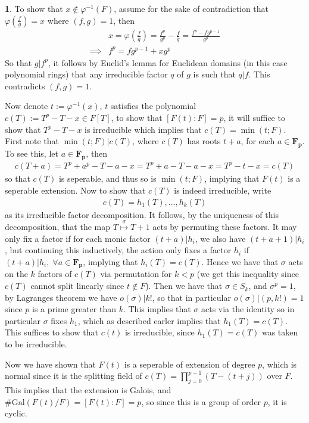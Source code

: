 \documentclass[11pt]{article}
\theoremstyle{definition}
\newtheorem{pb}{}
\newcommand{\gal}{\text{Gal}}
\begin{document}
    \begin{pb}
        To show that \(x \not \in \varphi^{-1}(F)\), assume for the sake of contradiction that \(\varphi(\frac{f}{g}) = x\) where \((f,g) = 1\), then
        \begin{align*}
            &x = \varphi(\frac{f}{g}) = \frac{f^p}{g^p} - \frac{f}{g} = \frac{f^p - fg^{p-1}}{g^p} \\
            \implies &f^p = fg^{p-1} + xg^p 
        \end{align*}
        So that \(g \vert f^p\), it follows by Euclid's lemma for Euclidean domains (in this case polynomial rings) that any irreducible factor \(q\) of \(g\) is such that \(q \vert f\). This contradicts \((f,g) = 1\).

        Now denote \(t := \varphi^{-1}(x)\), \(t\) satisfies the polynomial \(c(T) := T^p - T - x \in F[T]\), to show that \([F(t):F] = p\), it will suffice to show that \(T^p - T - x\) is irreducible which implies that \(c(T) = \min(t;F)\). First note that \(\min(t;F) \vert c(T)\), where \(c(T)\) has roots \(t + a\), for each \(a \in \mathbf{F_p}\). To see this, let \(a \in \mathbf{F_p}\), then
        \begin{align*}
            c(T + a) = T^p + a^p - T - a - x = T^p + a - T - a - x = T^p - t - x = c(T)
        \end{align*}
        so that \(c(T)\) is seperable, and thus so is \(\min(t;F)\), implying that \(F(t)\) is a seperable extension. Now to show that \(c(T)\) is indeed irreducible, write
        \begin{align*}
            c(T) = h_1(T),\hdots,h_k(T)
        \end{align*}
        as its irreducible factor decomposition. It follows, by the uniqueness of this decomposition, that the map \(T \overset{\sigma}{\mapsto} T+1\) acts by permuting these factors. It may only fix a factor if for each monic factor \((t + a) \vert h_i\), we also have \((t + a + 1) \vert h_i\), but continuing this inductively, the action only fixes a factor \(h_i\) if \((t + a) \vert h_i, \; \forall a \in \mathbf{F_p}\), implying that \(h_i(T) = c(T)\). Hence we have that \(\sigma\) acts on the \(k\) factors of \(c(T)\) via permutation for \(k < p\) (we get this inequality since \(c(T)\) cannot split linearly since \(t \not \in F\)). Then we have that \(\sigma \in S_k\), and \(\sigma^p = 1\), by Lagranges theorem we have \(o(\sigma) \vert k!\), so that in particular \(o(\sigma) \vert (p,k!) = 1\) since \(p\) is a prime greater than \(k\). This implies that \(\sigma\) acts via the identity so in particular \(\sigma\) fixes \(h_1\), which as described earler implies that \(h_1(T) = c(T)\). This suffices to show that \(c(t)\) is irreducible, since \(h_1(T) = c(T)\) was taken to be irreducible.

        Now we have shown that \(F(t)\) is a seperable of extension of degree \(p\), which is normal since it is the splitting field of \(c(T) = \prod_{j=0}^{p-1}(T-(t+j))\) over \(F\). This implies that the extension is Galois, and \(\# \gal(F(t)/F) = [F(t):F] = p\), so since this is a group of order \(p\), it is cyclic.
    \end{pb}
\end{document}
